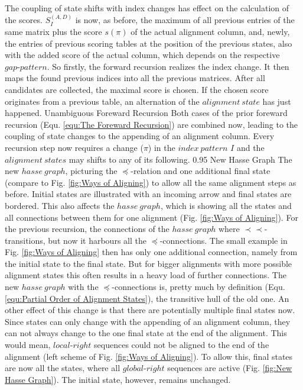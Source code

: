 \documentclass[a4paper,10pt]{thesis}
\newcommand{\pprec}{\mathrel{\prec\!\!\!\!\prec}}
\newcommand{\gR}{$global\texttt{-}right$}
\newcommand{\lR}{$local\texttt{-}right$}
\newcommand{\pP}{$gap\texttt{-}pattern$}
\begin{document}
{{{{        \gapSmall
        The coupling of state shifts with index changes has effect on the calculation of the scores. $S^{(A,D)}_I$ is now, as before, the maximum of all previous entries of the same matrix plus the score $s(\pi)$ of the actual alignment column, and, newly, the entries of previous scoring tables at the position of the previous states, also with the added score of the actual column, which depends on the respective \pP{}. So firstly, the forward recursion realizes the index change. It then maps the found previous indices into all the previous matrices. After all candidates are collected, the maximal score is chosen. If the chosen score originates from a previous table, an alternation of the $alignment~state$ has just happened.
        {Unambiguous Foreward Recursion}
        {Both cases of the prior foreward recursion (Equ. \ref{equ:The Foreward Recursion}) are combined now, leading to the coupling of state changes to the appending of an alignment column. Every recursion step now requires a change ($\pi$) in the $index~pattern$ $I$ and the $alignment~states$ may shifts to any of its following.}%
        {0.95\textwidth}
        {New Hasse Graph}
        {The new $hasse~graph$, picturing the $\preceq$-relation and one additional final state (compare to Fig. \ref{fig:Ways of Aligning}) to allow all the same alignment steps as before. Initial states are illustrated with an incoming arrow and final states are bordered.}%
        }%
        This also affects the $hasse~graph$, which is showing all the states and all connections between them for one alignment (Fig. \ref{fig:Ways of Aligning}). For the previous recursion, the connections of the $hasse~graph$ where $\pprec$-transitions, but now it harbours all the $\preceq$-connections. The small example in Fig. \ref{fig:Ways of Aligning} then has only one additional connection, namely from the initial state to the final state. But for bigger alignments with more possible alignment states this often results in a heavy load of further connections. The new $hasse~graph$ with the $\preceq$-connections is, pretty much by definition (Equ. \ref{equ:Partial Order of Alignment States}), the transitive hull of the old one.
        \gapSmall
        An other effect of this change is that there are potentially multiple final states now. Since states can only change with the appending of an alignment column, they can not always change to the one final state at the end of the alignment. This would mean, \lR{} sequences could not be aligned to the end of the alignment (left scheme of Fig. \ref{fig:Ways of Aligning}). To allow this, final states are now all the states, where all \gR{} sequences are active (Fig. \ref{fig:New Hasse Graph}). The initial state, however, remains unchanged.
}}}
\end{document}
